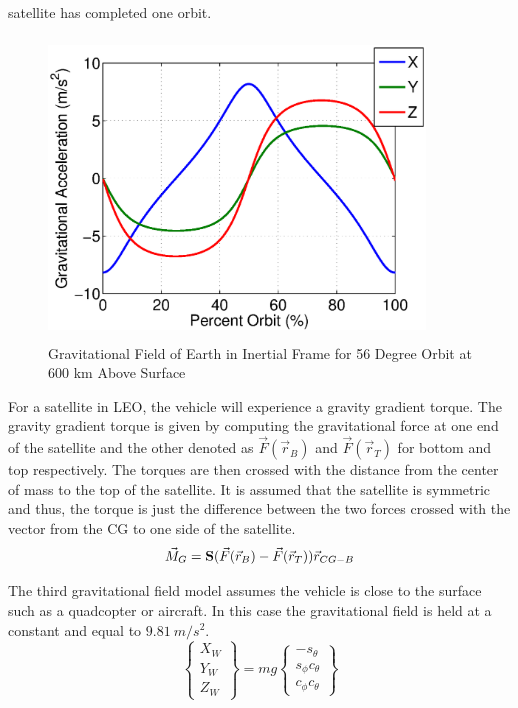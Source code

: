 satellite has completed one orbit.
\begin{figure}[H]
  \begin{center}
  \includegraphics[height=80mm, width=100mm]{Figures/Gravity_Field_Orbit}
  \end{center}
  \caption{Gravitational Field of Earth in Inertial Frame for 56 Degree
    Orbit at 600 km Above Surface}\label{f:grav_orbit}
\end{figure}

For a satellite in LEO, the vehicle will experience a gravity gradient
torque. The gravity gradient torque is given by computing the
gravitational force at one end of the satellite and the other denoted
as $\vec{F}(\vec{r}_B)$ and $\vec{F}(\vec{r}_T)$ for bottom and top
respectively. The torques are then crossed with the distance from the
center of mass to the top of the satellite. It is assumed that the
satellite is symmetric and thus, the torque is just the difference
between the two forces crossed with the vector from the CG to one side
of the satellite. 
\begin{equation}
    \vec{M}_G = {\bf S}(\vec{F}(\vec{r}_B)-\vec{F}(\vec{r}_T))\vec{r}_{CG-B}
\end{equation}

The third gravitational field model assumes the vehicle is close to
the surface such as a quadcopter or aircraft. In this case the
gravitational field is held at a constant and equal to $9.81~m/s^2$.
\begin{equation}\label{e:wforce}
\begin{Bmatrix} X_W \\ Y_W \\ Z_W \end{Bmatrix} = mg \begin{Bmatrix}
-s_{\theta} \\ s_{\phi}c_{\theta} \\ c_{\phi}c_{\theta} \end{Bmatrix}
\end{equation}

